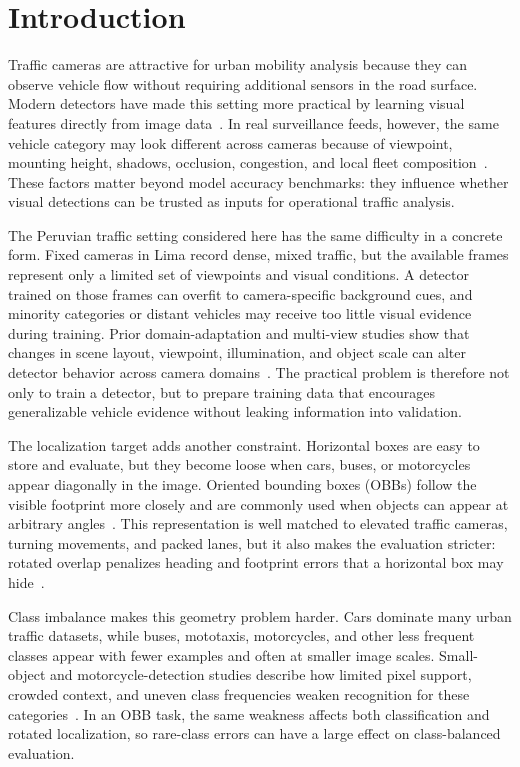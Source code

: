 \section{Introduction}
\label{sec:introduction}

Traffic cameras are attractive for urban mobility analysis because they can observe vehicle flow without requiring additional sensors in the road surface. Modern detectors have made this setting more practical by learning visual features directly from image data~\cite{Zou2023ObjectDetectionSurvey}. In real surveillance feeds, however, the same vehicle category may look different across cameras because of viewpoint, mounting height, shadows, occlusion, congestion, and local fleet composition~\cite{Zhou2025TrafficSurveillanceSurvey,Azfar2024ComplexTrafficReview}. These factors matter beyond model accuracy benchmarks: they influence whether visual detections can be trusted as inputs for operational traffic analysis.

The Peruvian traffic setting considered here has the same difficulty in a concrete form. Fixed cameras in Lima record dense, mixed traffic, but the available frames represent only a limited set of viewpoints and visual conditions. A detector trained on those frames can overfit to camera-specific background cues, and minority categories or distant vehicles may receive too little visual evidence during training. Prior domain-adaptation and multi-view studies show that changes in scene layout, viewpoint, illumination, and object scale can alter detector behavior across camera domains~\cite{Koga2021VehicleDomainAdaptation,Vora2023GeneralizationMultiview}. The practical problem is therefore not only to train a detector, but to prepare training data that encourages generalizable vehicle evidence without leaking information into validation.

The localization target adds another constraint. Horizontal boxes are easy to store and evaluate, but they become loose when cars, buses, or motorcycles appear diagonally in the image. Oriented bounding boxes (OBBs) follow the visible footprint more closely and are commonly used when objects can appear at arbitrary angles~\cite{Wang2025OBBSurvey,Zand2022OBB}. This representation is well matched to elevated traffic cameras, turning movements, and packed lanes, but it also makes the evaluation stricter: rotated overlap penalizes heading and footprint errors that a horizontal box may hide~\cite{Ahmed2025}.

Class imbalance makes this geometry problem harder. Cars dominate many urban traffic datasets, while buses, mototaxis, motorcycles, and other less frequent classes appear with fewer examples and often at smaller image scales. Small-object and motorcycle-detection studies describe how limited pixel support, crowded context, and uneven class frequencies weaken recognition for these categories~\cite{Espinosa2020,Cheng2023SmallObjectSurvey,Nikouei2025SmallObjectSurvey}. In an OBB task, the same weakness affects both classification and rotated localization, so rare-class errors can have a large effect on class-balanced evaluation.


